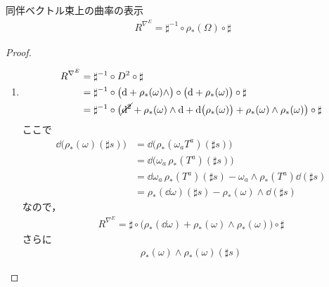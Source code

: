 \documentclass[geometry_main]{subfiles}
\begin{document}
\begin{mytheo}[label=thm:curvature-assoc]{同伴ベクトル束上の曲率の表示}
    \begin{align}
        R^{\nabla^E} = \sharp^{-1} \circ \rho_*(\Omega) \circ \sharp
    \end{align}
\end{mytheo}

\begin{proof}
    \begin{enumerate}
        \item 
        \begin{align}
            R^{\nabla^E}
            &= \sharp^{-1} \circ D^2 \circ \sharp \\
            &= \sharp^{-1} \circ \bigl( \dd + \rho_*(\omega) \wedge \bigr)\circ \bigl( \dd + \rho_*(\omega)\bigr) \circ \sharp \\
            &= \sharp^{-1} \circ \bigl( \cancel{\dd^2} + \rho_*(\omega) \wedge \dd + \dd{\bigl( \rho_*(\omega) \bigr)} + \rho_*(\omega) \wedge \rho_*(\omega) \bigr) \circ \sharp
        \end{align}
        ここで
        \begin{align}
            \dd{\bigl( \rho_*(\omega)(\sharp s) \bigr) }
            &= \dd{\bigl( \rho_*(\omega_a T^a)(\sharp s) \bigr) } \\
            &= \dd{\bigl(\omega_a \,\rho_*(T^a)(\sharp s) \bigr) } \\
            &= \dd{\omega_a}\, \rho_*(T^a)(\sharp s) - \omega_a\wedge \rho_*(T^a)\dd{(\sharp s)} \\
            &= \rho_*(\dd{\omega})(\sharp s) - \rho_*(\omega) \wedge \dd{(\sharp s)}
        \end{align}
        なので，
        \begin{align}
            R^{\nabla^E} = \sharp \circ \bigl( \rho_*(\dd{\omega}) + \rho_*(\omega) \wedge \rho_*(\omega)\bigr) \circ \sharp
        \end{align}
        さらに
        \begin{align}
            \rho_*(\omega) \wedge \rho_*(\omega)(\sharp s)

\end{align}
\end{enumerate}
\end{proof}
\end{document}
